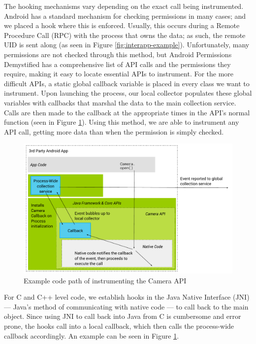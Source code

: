 The hooking mechanisms vary depending on the exact call being instrumented. Android has a standard mechanism for checking permissions in many cases; and we placed a hook where this is enforced. Usually, this occurs during a Remote Procedure Call (RPC) with the process that owns the data; as such, the remote UID is sent along (as seen in Figure \ref{fig:interapp-example}). Unfortunately, many permissions are not checked through this method, but Android Permissions Demystified\citep{felt2011android} has a comprehensive list of API calls and the permissions they require, making it easy to locate essential APIs to instrument. For the more difficult APIs, a static global callback variable is placed in every class we want to instrument. Upon launching the process, our local collector populates these global variables with callbacks that marshal the data to the main collection service. Calls are then made to the callback at the appropriate times in the API's normal function (seen in Figure \ref{fig:camera-example}). Using this method, we are able to instrument any API call, getting more data than when the permission is simply checked.

\begin{figure}[t]
\begin{center}
\includegraphics[width=1.0\columnwidth]{figs/AndroMEDA-Static-Example}
\caption{Example code path of instrumenting the Camera API}
\label{fig:camera-example}
\end{center}
\end{figure}

For C and C++ level code, we establish hooks in the Java Native Interface (JNI) --- Java's method of communicating with native code --- to call back to the main object. Since using JNI to call back into Java from C is cumbersome and error prone, the hooks call into a local callback, which then calls the process-wide callback accordingly. An example can be seen in Figure \ref{fig:camera-example}.


